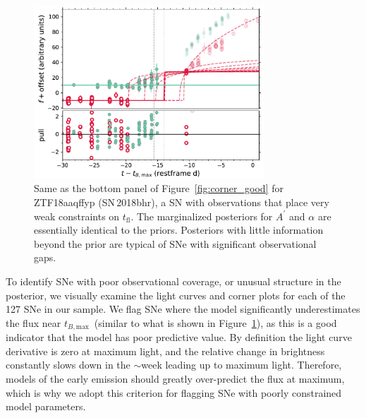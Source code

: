 \documentclass[twocolumn]{aastex63}
\newcommand{\tfl}{$t_\mathrm{fl}$}
\newcommand{\tbmax}{$t_{B,\mathrm{max}}$}
\begin{document}
\begin{figure}
    \centering
    \includegraphics[width=3.4in]{./figures/ZTF18aaqffyp_model_lc.pdf}
    \caption{Same as the bottom panel of Figure~\ref{fig:corner_good} for
    ZTF18aaqffyp (SN\,2018bhr), a SN with observations that place very weak
    constraints on \tfl. The marginalized posteriors for $A^\prime$ and
    $\alpha$ are essentially identical to the priors. Posteriors with little
    information beyond the prior are typical of SNe with significant
    observational gaps.}
    \label{fig:biggap_lc}
\end{figure}

To identify SNe with poor observational coverage, or unusual structure in the
posterior, we visually examine the light curves and corner plots for each of
the 127 SNe in our sample. We flag SNe where the model significantly
underestimates the flux near \tbmax\ (similar to what is shown in
Figure~\ref{fig:biggap_lc}), as this is a good indicator that the model has
poor predictive value. By definition the light curve derivative is zero at
maximum light, and the relative change in brightness constantly slows down in
the $\sim$week leading up to maximum light. Therefore, models of the early
emission should greatly over-predict the flux at maximum, which is why we
adopt this criterion for flagging SNe with poorly constrained model
parameters.
\end{document}
